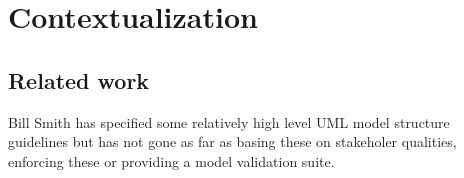 \section{Contextualization}
\label{sec:contextualization}


\subsection{Related work}
\label{sec:relatedWork}

Bill Smith \cite{smith:ibmModelStructureGuildelines_a, smith:ibmModelStructureGuildelines_b}
has specified some relatively high level UML model structure guidelines but has not gone as far
as basing these on stakeholer qualities, enforcing these or providing a model validation suite.
